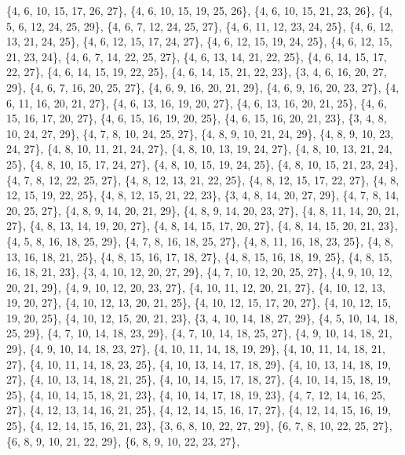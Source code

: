 \documentclass[11pt,a4paper]{article}
\begin{document}
{\{4, 6, 10, 15, 17, 26, 27\}, \{4, 6, 10, 15, 19, 25, 26\}, \{4, 6, 10, 15, 21, 23, 26\}, \{4, 5, 6, 12, 24, 25, 29\}, \{4, 6, 7, 12, 24, 25, 27\},
\{4, 6, 11, 12, 23, 24, 25\}, \{4, 6, 12, 13, 21, 24, 25\}, \{4, 6, 12, 15, 17, 24, 27\}, \{4, 6, 12, 15, 19, 24, 25\}, \{4, 6, 12, 15, 21, 23, 24\},
\{4, 6, 7, 14, 22, 25, 27\}, \{4, 6, 13, 14, 21, 22, 25\}, \{4, 6, 14, 15, 17, 22, 27\}, \{4, 6, 14, 15, 19, 22, 25\}, \{4, 6, 14, 15, 21, 22, 23\},
\{3, 4, 6, 16, 20, 27, 29\}, \{4, 6, 7, 16, 20, 25, 27\}, \{4, 6, 9, 16, 20, 21, 29\}, \{4, 6, 9, 16, 20, 23, 27\}, \{4, 6, 11, 16, 20, 21, 27\},
\{4, 6, 13, 16, 19, 20, 27\}, \{4, 6, 13, 16, 20, 21, 25\}, \{4, 6, 15, 16, 17, 20, 27\}, \{4, 6, 15, 16, 19, 20, 25\}, \{4, 6, 15, 16, 20, 21, 23\},
\{3, 4, 8, 10, 24, 27, 29\}, \{4, 7, 8, 10, 24, 25, 27\}, \{4, 8, 9, 10, 21, 24, 29\}, \{4, 8, 9, 10, 23, 24, 27\}, \{4, 8, 10, 11, 21, 24, 27\},
\{4, 8, 10, 13, 19, 24, 27\}, \{4, 8, 10, 13, 21, 24, 25\}, \{4, 8, 10, 15, 17, 24, 27\}, \{4, 8, 10, 15, 19, 24, 25\}, \{4, 8, 10, 15, 21, 23, 24\},
\{4, 7, 8, 12, 22, 25, 27\}, \{4, 8, 12, 13, 21, 22, 25\}, \{4, 8, 12, 15, 17, 22, 27\}, \{4, 8, 12, 15, 19, 22, 25\}, \{4, 8, 12, 15, 21, 22, 23\},
\{3, 4, 8, 14, 20, 27, 29\}, \{4, 7, 8, 14, 20, 25, 27\}, \{4, 8, 9, 14, 20, 21, 29\}, \{4, 8, 9, 14, 20, 23, 27\}, \{4, 8, 11, 14, 20, 21, 27\},
\{4, 8, 13, 14, 19, 20, 27\}, \{4, 8, 14, 15, 17, 20, 27\}, \{4, 8, 14, 15, 20, 21, 23\}, \{4, 5, 8, 16, 18, 25, 29\}, \{4, 7, 8, 16, 18, 25, 27\},
\{4, 8, 11, 16, 18, 23, 25\}, \{4, 8, 13, 16, 18, 21, 25\}, \{4, 8, 15, 16, 17, 18, 27\}, \{4, 8, 15, 16, 18, 19, 25\}, \{4, 8, 15, 16, 18, 21, 23\},
\{3, 4, 10, 12, 20, 27, 29\}, \{4, 7, 10, 12, 20, 25, 27\}, \{4, 9, 10, 12, 20, 21, 29\}, \{4, 9, 10, 12, 20, 23, 27\}, \{4, 10, 11, 12, 20, 21, 27\},
\{4, 10, 12, 13, 19, 20, 27\}, \{4, 10, 12, 13, 20, 21, 25\}, \{4, 10, 12, 15, 17, 20, 27\}, \{4, 10, 12, 15, 19, 20, 25\}, \{4, 10, 12, 15, 20, 21, 23\},
\{3, 4, 10, 14, 18, 27, 29\}, \{4, 5, 10, 14, 18, 25, 29\}, \{4, 7, 10, 14, 18, 23, 29\}, \{4, 7, 10, 14, 18, 25, 27\}, \{4, 9, 10, 14, 18, 21, 29\},
\{4, 9, 10, 14, 18, 23, 27\}, \{4, 10, 11, 14, 18, 19, 29\}, \{4, 10, 11, 14, 18, 21, 27\}, \{4, 10, 11, 14, 18, 23, 25\}, \{4, 10, 13, 14, 17, 18, 29\},
\{4, 10, 13, 14, 18, 19, 27\}, \{4, 10, 13, 14, 18, 21, 25\}, \{4, 10, 14, 15, 17, 18, 27\}, \{4, 10, 14, 15, 18, 19, 25\}, \{4, 10, 14, 15, 18, 21, 23\},
\{4, 10, 14, 17, 18, 19, 23\}, \{4, 7, 12, 14, 16, 25, 27\}, \{4, 12, 13, 14, 16, 21, 25\}, \{4, 12, 14, 15, 16, 17, 27\}, \{4, 12, 14, 15, 16, 19, 25\},
\{4, 12, 14, 15, 16, 21, 23\}, \{3, 6, 8, 10, 22, 27, 29\}, \{6, 7, 8, 10, 22, 25, 27\}, \{6, 8, 9, 10, 21, 22, 29\}, \{6, 8, 9, 10, 22, 23, 27\},
}
\end{document}
